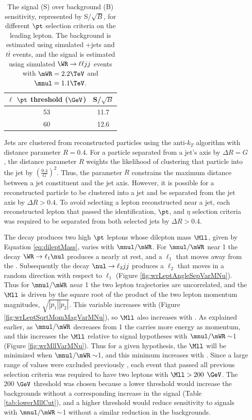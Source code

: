 \begin{table}[h]
	\caption{The signal (S) over background (B) sensitivity, represented by S/$\sqrt{B}$, for different $\pt$ selection 
		criteria on the leading lepton.  The background is estimated using simulated \DY+jets and $t\bar{t}$ events, and the 
		signal is estimated using simulated $\WR \rightarrow \ell\ell jj$ events with $\mWR = 2.2 \TeV$ and $\mnul = 1.1 \TeV$.}
	\label{tab:lowerLeptPtCut}
	\centering
	\begin{tabular}{c|c}
		$\ell$ $\pt$ threshold ($\GeV$) & S/$\sqrt{B}$ \\  \hline
		53 &  11.7  \\
		60 &  12.6  \\ \hline
	\end{tabular}
\end{table}

Jets are clustered from reconstructed particles using the anti-$k_{T}$ algorithm with distance parameter $R = 0.4$.  For a particle 
separated from a jet's axis by $\Delta R = G$, the distance parameter $R$ weights the likelihood of clustering that particle into the 
jet by $(\frac{0.4}{G})^{2}$.  Thus, the parameter $R$ constrains the maximum distance between a jet constituent and the jet axis.  
However, it is possible for a reconstructed particle to be clustered into a jet and be separated from the jet axis by $\Delta R > 0.4$.  
To avoid selecting a lepton reconstructed near a jet, each reconstructed lepton that passed the identification, $\pt$, and $\eta$ 
selection criteria was required to be separated from both selected jets by $\Delta R > 0.4$.

The \WR decay produces two high $\pt$ leptons whose dilepton mass $\Mll$, given by Equation \ref{eq:dileptMass}, varies with $\mnul/\mWR$.  
For $\mnul/\mWR$ near 1 the decay $\WR \rightarrow \ell_{1}\nul$ produces a \nul nearly at rest, and a $\ell_{1}$ that moves away from the 
\nul.  Subsequently the decay $\nul \rightarrow \ell_{2}jj$ produces a $\ell_{2}$ that moves in a random direction with respect to 
$\ell_{1}$ (Figure \ref{fig:wrLeptAngleSepVarMNu}).  Thus for $\mnul/\mWR$ near 1 the two lepton trajectories are uncorrelated, and the 
$\Mll$ is driven by the square root of the product of the two lepton momentum magnitudes, $\sqrt{|p_{1}||p_{2}|}$.  This variable increases 
with \mWR (Figure \ref{fig:wrLeptSqrtMomMagVarMNu}), so $\Mll$ also increases with \mWR.  As explained earlier, as $\mnul/\mWR$ decreases 
from 1 the \nul carries more energy as momentum, and this increases the $\Mll$ relative to signal hypotheses with $\mnul/\mWR \sim$1 (Figure 
\ref{fig:wrMllVarMNu}).  Thus for a given \mWR hypothesis, the $\Mll$ will be minimized when $\mnul/\mWR \sim$1, and this minimum increases 
with \mWR.  Since a large range of \mWR values were excluded previously \cite{cmsWRRunOneResults}, each event that passed all previous 
selection criteria was required to have two leptons with $\Mll > 200$ $\GeV$.  The 200 $\GeV$ threshold was chosen because a lower threshold 
would increase the backgrounds without a corresponding increase in the signal (Table \ref{tab:lowerMllCut}), and a higher threshold would 
reduce sensitivity to signals with $\mnul/\mWR \sim$1 without a similar reduction in the backgrounds.

